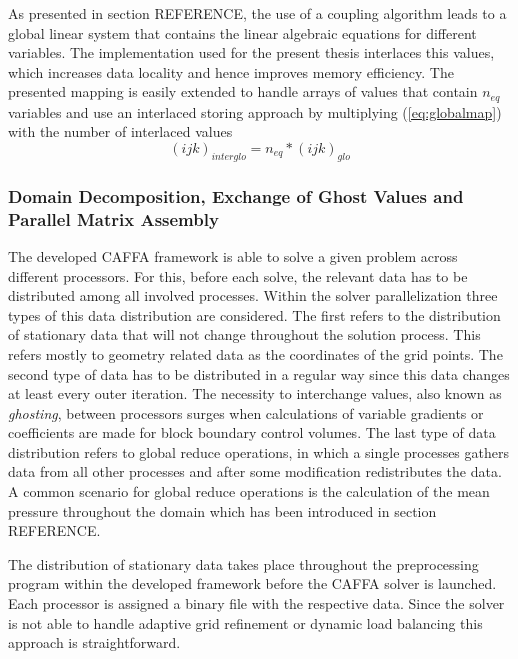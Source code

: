 As presented in section REFERENCE, the use of a coupling algorithm leads to a global linear system that contains the linear algebraic equations for different variables. The implementation used for the present thesis interlaces this values, which increases data locality and hence improves memory efficiency. The presented mapping is easily extended to handle arrays of values that contain \(n_{eq}\) variables and use an interlaced storing approach by multiplying (\ref{eq:globalmap}) with the number of interlaced values
\begin{displaymath}
  (ijk)_{interglo} = n_{eq} * (ijk)_{glo} 
\end{displaymath}

\subsubsection{Domain Decomposition, Exchange of Ghost Values and Parallel Matrix Assembly}

The developed CAFFA framework is able to solve a given problem across different processors. For this, before each solve, the relevant data has to be distributed among all involved processes. Within the solver parallelization three types of this data distribution are considered. The first refers to the distribution of stationary data that will not change throughout the solution process. This refers mostly to geometry related data as the coordinates of the grid points. The second type of data has to be distributed in a regular way since this data changes at least every outer iteration. The necessity to interchange values, also known as \emph{ghosting}, between processors surges when calculations of variable gradients or coefficients are made for block boundary control volumes. The last type of data distribution refers to global reduce operations, in which a single processes gathers data from all other processes and after some modification redistributes the data. A common scenario for global reduce operations is the calculation of the mean pressure throughout the domain which has been introduced in section REFERENCE.

The distribution of stationary data takes place throughout the preprocessing program within the developed framework before the CAFFA solver is launched. Each processor is assigned a binary file with the respective data. Since the solver is not able to handle adaptive grid refinement or dynamic load balancing this approach is straightforward.

